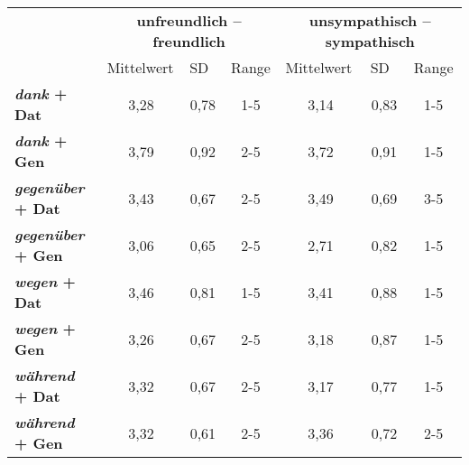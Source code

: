 \begin{table}
\begin{small}
\centering
\begin{tabular}{lcccccc}
                         & \multicolumn{3}{c}{\textbf{unfreundlich -- freundlich}}                        & \multicolumn{3}{|c}{\textbf{unsympathisch -- sympathisch}}                      \\
                         & \multicolumn{1}{l}{Mittelwert} & \multicolumn{1}{l}{SD} & Range                & \multicolumn{1}{|l}{Mittelwert} & \multicolumn{1}{l}{SD} & Range                \\
\rowcolor[HTML]{C0C0C0} 
\textbf{\textit{dank} + Dat}      & 3,28                           & 0,78                   & 1-5                  & 3,14                           & 0,83                   & 1-5                  \\
\textbf{\textit{dank} + Gen}      & 3,79                           & 0,92                   & 2-5                  & 3,72                           & 0,91                   & 1-5                  \\
\rowcolor[HTML]{C0C0C0} 
\textbf{\textit{gegenüber} + Dat} & 3,43                           & 0,67                   & 2-5                  & 3,49                           & 0,69                   & 3-5                  \\
\textbf{\textit{gegenüber} + Gen} & 3,06                           & 0,65                   & 2-5                  & 2,71                           & 0,82                   & 1-5                  \\
\rowcolor[HTML]{C0C0C0} 
\textbf{\textit{wegen} + Dat}     & 3,46                           & 0,81                   & 1-5                  & 3,41                           & 0,88                   & 1-5                  \\
\textbf{\textit{wegen} + Gen}     & 3,26                           & 0,67                   & 2-5                  & 3,18                           & 0,87                   & 1-5                  \\
\rowcolor[HTML]{C0C0C0} 
\textbf{\textit{während} + Dat}   & 3,32                           & 0,67                   & 2-5                  & 3,17                           & 0,77                   & 1-5                  \\
\textbf{\textit{während} + Gen}   & 3,32                           & 0,61                   & 2-5                  & 3,36                           & 0,72                   & 2-5                  \\

\end{tabular}
\end{small}
\end{table}
